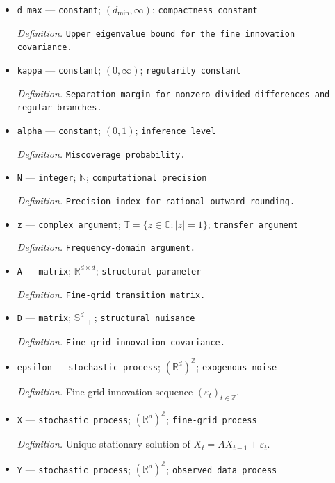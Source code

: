 \documentclass{article}
\begin{document}
\begin{itemize}
  \item \texttt{d\_\allowbreak{}max} --- \texttt{constant}; \((d_{\min},\infty)\); \texttt{compactness constant}
  \par\smallskip\noindent\emph{Definition.} \texttt{Upper eigenvalue bound for the fine innovation covariance.}
  \item \texttt{kappa} --- \texttt{constant}; \((0,\infty)\); \texttt{regularity constant}
  \par\smallskip\noindent\emph{Definition.} \texttt{Separation margin for nonzero divided differences and regular branches.}
  \item \texttt{alpha} --- \texttt{constant}; \((0,1)\); \texttt{inference level}
  \par\smallskip\noindent\emph{Definition.} \texttt{Miscoverage probability.}
  \item \texttt{N} --- \texttt{integer}; \(\mathbb N\); \texttt{computational precision}
  \par\smallskip\noindent\emph{Definition.} \texttt{Precision index for rational outward rounding.}
  \item \texttt{z} --- \texttt{complex argument}; \(\mathbb T=\{z\in\mathbb C:|z|=1\}\); \texttt{transfer argument}
  \par\smallskip\noindent\emph{Definition.} \texttt{Frequency-\allowbreak{}domain argument.}
  \item \texttt{A} --- \texttt{matrix}; \(\mathbb R^{d\times d}\); \texttt{structural parameter}
  \par\smallskip\noindent\emph{Definition.} \texttt{Fine-\allowbreak{}grid transition matrix.}
  \item \texttt{D} --- \texttt{matrix}; \(\mathbb S_{++}^{d}\); \texttt{structural nuisance}
  \par\smallskip\noindent\emph{Definition.} \texttt{Fine-\allowbreak{}grid innovation covariance.}
  \item \texttt{epsilon} --- \texttt{stochastic process}; \((\mathbb R^d)^{\mathbb Z}\); \texttt{exogenous noise}
  \par\smallskip\noindent\emph{Definition.} Fine-grid innovation sequence \((\varepsilon_t)_{t\in\mathbb Z}\).
  \item \texttt{X} --- \texttt{stochastic process}; \((\mathbb R^d)^{\mathbb Z}\); \texttt{fine-\allowbreak{}grid process}
  \par\smallskip\noindent\emph{Definition.} Unique stationary solution of \(X_t=AX_{t-1}+\varepsilon_t\).
  \item \texttt{Y} --- \texttt{stochastic process}; \((\mathbb R^d)^{\mathbb Z}\); \texttt{observed data process}

\end{itemize}
\end{document}
